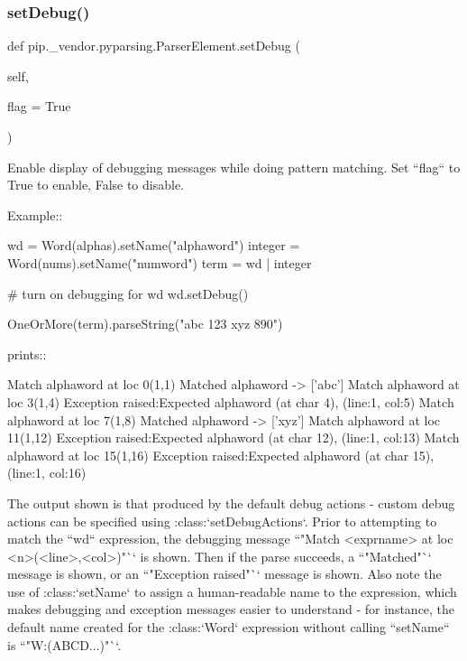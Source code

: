 \subsubsection{\texorpdfstring{set\+Debug()}{setDebug()}}
{\footnotesize\ttfamily def pip.\+\_\+vendor.\+pyparsing.\+Parser\+Element.\+set\+Debug (\begin{DoxyParamCaption}\item[{}]{self,  }\item[{}]{flag = {\ttfamily True} }\end{DoxyParamCaption})}

\begin{DoxyVerb}Enable display of debugging messages while doing pattern matching.
Set ``flag`` to True to enable, False to disable.

Example::

    wd = Word(alphas).setName("alphaword")
    integer = Word(nums).setName("numword")
    term = wd | integer

    # turn on debugging for wd
    wd.setDebug()

    OneOrMore(term).parseString("abc 123 xyz 890")

prints::

    Match alphaword at loc 0(1,1)
    Matched alphaword -> ['abc']
    Match alphaword at loc 3(1,4)
    Exception raised:Expected alphaword (at char 4), (line:1, col:5)
    Match alphaword at loc 7(1,8)
    Matched alphaword -> ['xyz']
    Match alphaword at loc 11(1,12)
    Exception raised:Expected alphaword (at char 12), (line:1, col:13)
    Match alphaword at loc 15(1,16)
    Exception raised:Expected alphaword (at char 15), (line:1, col:16)

The output shown is that produced by the default debug actions - custom debug actions can be
specified using :class:`setDebugActions`. Prior to attempting
to match the ``wd`` expression, the debugging message ``"Match <exprname> at loc <n>(<line>,<col>)"``
is shown. Then if the parse succeeds, a ``"Matched"`` message is shown, or an ``"Exception raised"``
message is shown. Also note the use of :class:`setName` to assign a human-readable name to the expression,
which makes debugging and exception messages easier to understand - for instance, the default
name created for the :class:`Word` expression without calling ``setName`` is ``"W:(ABCD...)"``.
\end{DoxyVerb}
 \mbox{\label{classpip_1_1__vendor_1_1pyparsing_1_1ParserElement_aa5dc02dc9dd7f139a0400723da8947c1}} 
